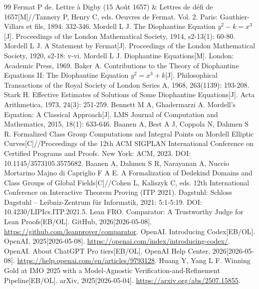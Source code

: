 \newpage
{}
\renewcommand\refname{参考文献}

\begin{thebibliography}{99}
\setlength{\itemsep}{0pt}
 Fermat P de. Lettre à Digby (15 Août 1657) \& Lettres de défi de 1657[M]//Tannery P, Henry C, eds. Oeuvres de Fermat. Vol. 2. Paris: Gauthier-Villars et fils, 1894: 332-346.
 Mordell L J. The Diophantine Equation \(y^2-k=x^3\)[J]. Proceedings of the London Mathematical Society, 1914, s2-13(1): 60-80.
 Mordell L J. A Statement by Fermat[J]. Proceedings of the London Mathematical Society, 1920, s2-18: v-vi.
 Mordell L J. Diophantine Equations[M]. London: Academic Press, 1969.
 Baker A. Contributions to the Theory of Diophantine Equations II: The Diophantine Equation \(y^2=x^3+k\)[J]. Philosophical Transactions of the Royal Society of London Series A, 1968, 263(1139): 193-208.
 Stark H. Effective Estimates of Solutions of Some Diophantine Equations[J]. Acta Arithmetica, 1973, 24(3): 251-259.
 Bennett M A, Ghadermarzi A. Mordell's Equation: A Classical Approach[J]. LMS Journal of Computation and Mathematics, 2015, 18(1): 633-646.
 Baanen A, Best A J, Coppola N, Dahmen S R. Formalized Class Group Computations and Integral Points on Mordell Elliptic Curves[C]//Proceedings of the 12th ACM SIGPLAN International Conference on Certified Programs and Proofs. New York: ACM, 2023. DOI: 10.1145/3573105.3575682.
 Baanen A, Dahmen S R, Narayanan A, Nuccio Mortarino Majno di Capriglio F A E. A Formalization of Dedekind Domains and Class Groups of Global Fields[C]//Cohen L, Kaliszyk C, eds. 12th International Conference on Interactive Theorem Proving (ITP 2021). Dagstuhl: Schloss Dagstuhl -- Leibniz-Zentrum für Informatik, 2021: 5:1-5:19. DOI: 10.4230/LIPIcs.ITP.2021.5.
 Lean FRO. Comparator: A Trustworthy Judge for Lean Proofs[EB/OL]. GitHub, 2026[2026-05-08]. \url{https://github.com/leanprover/comparator}.
 OpenAI. Introducing Codex[EB/OL]. OpenAI, 2025[2026-05-08]. \url{https://openai.com/index/introducing-codex/}.
 OpenAI. About ChatGPT Pro tiers[EB/OL]. OpenAI Help Center, 2026[2026-05-08]. \url{https://help.openai.com/en/articles/9793128}.
 Huang Y, Yang L F. Winning Gold at IMO 2025 with a Model-Agnostic Verification-and-Refinement Pipeline[EB/OL]. arXiv, 2025[2026-05-04]. \url{https://arxiv.org/abs/2507.15855}.

\end{thebibliography}

